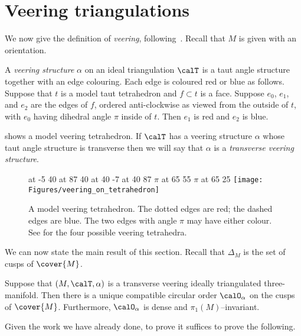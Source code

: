 \documentclass[12pt]{amsart}
\begin{document}
\section{Veering triangulations}
\label{Sec:Veering}

We now give the definition of \emph{veering}, following~\cite{Agol11, HRST11}.  Recall that $M$ is given with an orientation. 

\begin{definition}
\label{Def:Veering}
A \emph{veering structure} $\alpha$ on an ideal triangulation $\calT$ is a taut angle structure together with an edge colouring.  Each edge is coloured red or blue as follows. 
Suppose that $t$ is a model taut tetrahedron and $f \subset t$ is a face.  Suppose $e_0$, $e_1$, and $e_2$ are the edges of $f$, ordered anti-clockwise as viewed from the outside of $t$, with $e_0$ having dihedral angle $\pi$ inside of $t$.  Then $e_1$ is red and $e_2$ is blue.  
\end{definition}

 shows a model veering tetrahedron.  If $\calT$ has a veering structure $\alpha$ whose taut angle structure is transverse then we will say that $\alpha$ is a \emph{transverse veering structure}.

\begin{figure}[htbp]
\small\hair 2pt
 at -5 40
 at 87 40
 at 40 -7
 at 40 87
\pinlabel $\pi$ at 65 55
\pinlabel $\pi$ at 65 25
\endlabellist
\texttt{[image: Figures/veering\_on\_tetrahedron]}
\caption{A model veering tetrahedron.  The dotted edges are red; the dashed edges are blue. The two edges with angle $\pi$ may have either colour.  See  for the four possible veering tetrahedra.}
\label{Fig:VeeringTet}
\end{figure}

We can now state the main result of this section.  Recall that $\Delta_M$ is the set of cusps of $\cover{M}$.  

\begin{theorem}
\label{Thm:VeerImpliesUnique}
Suppose that $(M, \calT, \alpha)$ is a transverse veering ideally triangulated three-manifold.  Then there is a unique compatible circular order $\calO_\alpha$ on the cusps of $\cover{M}$.  Furthermore, $\calO_\alpha$ is dense and $\pi_1(M)$--invariant.
\end{theorem}

Given the work we have already done, to prove  it suffices to prove the following.
\end{document}
